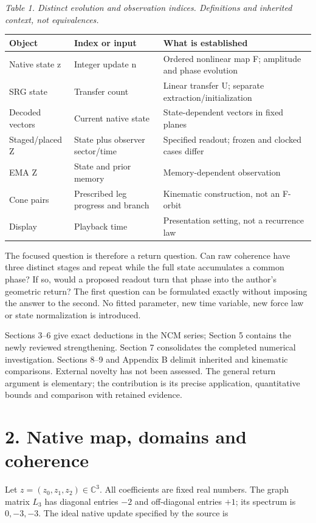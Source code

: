 \documentclass[11pt,a4paper]{article}
\begin{document}
\par\textit{Table 1. Distinct evolution and observation indices. Definitions and inherited context, not equivalences.}
\begingroup\small
\begin{tabularx}{\textwidth}{XXX}
\toprule
Object & Index or input & What is established\\\midrule
Native state z & Integer update n & Ordered nonlinear map F; amplitude and phase evolution\\
SRG state & Transfer count & Linear transfer U; separate extraction/initialization\\
Decoded vectors & Current native state & State-dependent vectors in fixed planes\\
Staged/placed Z & State plus observer sector/time & Specified readout; frozen and clocked cases differ\\
EMA Z & State and prior memory & Memory-dependent observation\\
Cone pairs & Prescribed leg progress and branch & Kinematic construction, not an F-orbit\\
Display & Playback time & Presentation setting, not a recurrence law\\
\bottomrule\end{tabularx}\endgroup\par
The focused question is therefore a return question. Can raw coherence have three distinct stages and repeat while the full state accumulates a common phase? If so, would a proposed readout turn that phase into the author’s geometric return? The first question can be formulated exactly without imposing the answer to the second. No fitted parameter, new time variable, new force law or state normalization is introduced. \cite{D02} \cite{D03}

Sections 3–6 give exact deductions in the NCM series; Section 5 contains the newly reviewed strengthening. Section 7 consolidates the completed numerical investigation. Sections 8–9 and Appendix B delimit inherited and kinematic comparisons. External novelty has not been assessed. The general return argument is elementary; the contribution is its precise application, quantitative bounds and comparison with retained evidence.

\clearpage
\section*{2. Native map, domains and coherence}
Let $z=(z_0,z_1,z_2)\in\mathbb{C}^3$. All coefficients are fixed real numbers. The graph matrix $L_3$ has diagonal entries $-2$ and off-diagonal entries $+1$; its spectrum is $0,-3,-3$. The ideal native update specified by the source is \cite{DYN}
\end{document}
